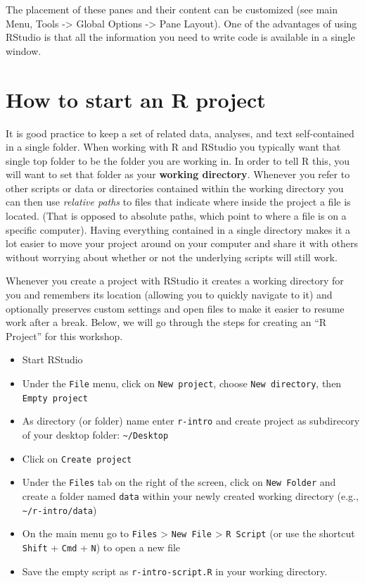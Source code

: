 \documentclass[]{book}
\providecommand{\tightlist}{%
  \setlength{\itemsep}{0pt}\setlength{\parskip}{0pt}}
\begin{document}
The placement of these panes and their content can be customized (see
main Menu, Tools -\textgreater{} Global Options -\textgreater{} Pane
Layout). One of the advantages of using RStudio is that all the
information you need to write code is available in a single window.

\section{How to start an R project}\label{how-to-start-an-r-project}

It is good practice to keep a set of related data, analyses, and text
self-contained in a single folder. When working with R and RStudio you
typically want that single top folder to be the folder you are working
in. In order to tell R this, you will want to set that folder as your
\textbf{working directory}. Whenever you refer to other scripts or data
or directories contained within the working directory you can then use
\emph{relative paths} to files that indicate where inside the project a
file is located. (That is opposed to absolute paths, which point to
where a file is on a specific computer). Having everything contained in
a single directory makes it a lot easier to move your project around on
your computer and share it with others without worrying about whether or
not the underlying scripts will still work.

Whenever you create a project with RStudio it creates a working
directory for you and remembers its location (allowing you to quickly
navigate to it) and optionally preserves custom settings and open files
to make it easier to resume work after a break. Below, we will go
through the steps for creating an ``R Project'' for this workshop.

\begin{itemize}
\tightlist
\item
  Start RStudio
\item
  Under the \texttt{File} menu, click on \texttt{New\ project}, choose
  \texttt{New\ directory}, then \texttt{Empty\ project}
\item
  As directory (or folder) name enter \texttt{r-intro} and create
  project as subdirecory of your desktop folder:
  \texttt{\textasciitilde{}/Desktop}
\item
  Click on \texttt{Create\ project}
\item
  Under the \texttt{Files} tab on the right of the screen, click on
  \texttt{New\ Folder} and create a folder named \texttt{data} within
  your newly created working directory (e.g.,
  \texttt{\textasciitilde{}/r-intro/data})
\item
  On the main menu go to \texttt{Files} \textgreater{}
  \texttt{New\ File} \textgreater{} \texttt{R\ Script} (or use the
  shortcut \texttt{Shift} + \texttt{Cmd} + \texttt{N}) to open a new
  file
\item
  Save the empty script as \texttt{r-intro-script.R} in your working
  directory.
\end{itemize}
\end{document}
